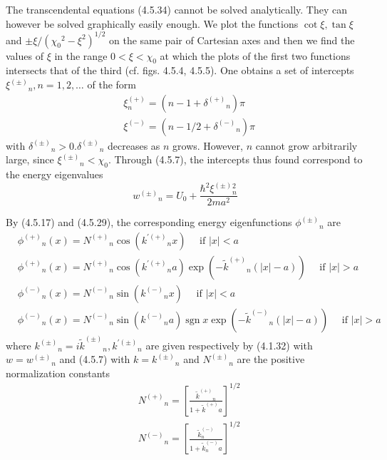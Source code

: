 \documentclass{article}
\begin{document}
The transcendental equations (4.5.34) cannot be solved analytically. They can however be solved graphically easily enough. We plot the functions $\cot \xi, \tan \xi$ and $\pm \xi /\left(\chi_{0}{ }^{2}-\xi^{2}\right)^{1 / 2}$ on the same pair of Cartesian axes and then we find the values of $\xi$ in the range $0<\xi<\chi_{0}$ at which the plots of the first two functions intersects that of the third (cf. figs. 4.5.4, 4.5.5). One obtains a set of intercepts $\xi^{( \pm)}{ }_{n}, n=1,2, \ldots$ of the form
$$
\begin{align*}
& \xi_{n}^{(+)}=\left(n-1+\delta^{(+)}{ }_{n}\right) \pi  \tag{4.5.36a}\\
& \xi^{(-)}=\left(n-1 / 2+\delta^{(-)}{ }_{n}\right) \pi \tag{4.5.36b}
\end{align*}
$$
with $\delta^{( \pm)}{ }_{n}>0 . \delta^{( \pm)}{ }_{n}$ decreases as $n$ grows. However, $n$ cannot grow arbitrarily large, since $\xi^{( \pm)}{ }_{n}<\chi_{0}$. Through (4.5.7), the intercepts thus found correspond to the energy eigenvalues
$$
\begin{equation*}
w^{( \pm)}{ }_{n}=U_{0}+\frac{\hbar^{2} \xi^{( \pm)}{ }_{n}^{2}}{2 m a^{2}} \tag{4.5.37}
\end{equation*}
$$

By (4.5.17) and (4.5.29), the corresponding energy eigenfunctions $\phi^{( \pm)}{ }_{n}$ are
$$
\begin{align*}
& \phi^{(+)}{ }_{n}(x)=N^{(+)}{ }_{n} \cos \left({k^{\prime(+)}}_{n} x\right) \quad \text { if }|x|<a  \tag{4.5.38a}\\
& \phi^{(+)}{ }_{n}(x)=N^{(+)}{ }_{n} \cos \left(k^{\prime(+)}{ }_{n} a\right) \exp \left(-\tilde{k}^{(+)}{ }_{n}(|x|-a)\right) \quad \text { if }|x|>a  \tag{4.5.38b}\\
& \phi^{(-)}{ }_{n}(x)=N^{(-)}{ }_{n} \sin \left(k^{(-)}{ }_{n} x\right) \quad \text { if }|x|<a  \tag{4.5.38c}\\
& \phi^{(-)}{ }_{n}(x)=N^{(-)}{ }_{n} \sin \left({k^{(-)}}_{n} a\right) \operatorname{sgn} x \exp \left(-\tilde{k}^{(-)}{ }_{n}(|x|-a)\right) \quad \text { if }|x|>a \tag{4.5.38d}
\end{align*}
$$
where $k^{( \pm)}{ }_{n}=i \tilde{k}^{( \pm)}{ }_{n}, k^{\prime( \pm)}{ }_{n}$ are given respectively by (4.1.32) with $w=w^{( \pm)}{ }_{n}$ and (4.5.7) with $k=k^{( \pm)}{ }_{n}$ and $N^{( \pm)}{ }_{n}$ are the positive normalization constants
$$
\begin{align*}
& N^{(+)}{ }_{n}=\left[\frac{\tilde{k}^{(+)}{ }_{n}}{1+\tilde{k}^{(+)} a}\right]^{1 / 2}  \tag{4.5.39a}\\
& N^{(-)}{ }_{n}=\left[\frac{\tilde{k}_{n}^{(-)}}{1+\tilde{k}_{n}^{(-)} a}\right]^{1 / 2} \tag{4.5.39b}
\end{align*}
$$
\end{document}
